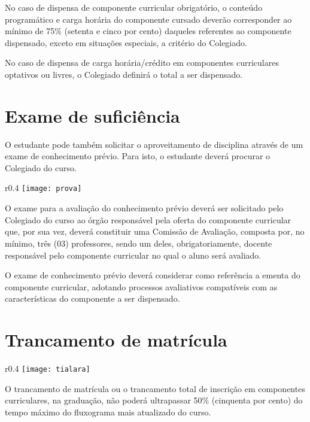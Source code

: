 No caso de dispensa de componente curricular obrigatório, o conteúdo programático e carga horária do componente cursado deverão corresponder ao mínimo de 75\% (setenta e cinco por cento) daqueles referentes ao componente dispensado, exceto em situações especiais, a critério do Colegiado.

No caso de dispensa de carga horária/crédito em componentes curriculares optativos ou livres, o Colegiado definirá o total a ser dispensado.

\section{Exame de suficiência}

O estudante pode também solicitar o aproveitamento de disciplina através de um exame de conhecimento prévio. Para isto, o estudante deverá procurar o Colegiado do curso.

 \begin{wrapfigure}{r}{0.4\textwidth}
        \centering
        \texttt{[image: prova]}
    \end{wrapfigure}

O exame para a avaliação do conhecimento prévio deverá ser solicitado pelo Colegiado do curso ao órgão responsável pela oferta do componente curricular que, por sua vez, deverá constituir uma Comissão de Avaliação, composta por, no mínimo, três (03) professores, sendo um deles, obrigatoriamente, docente responsável pelo componente curricular no qual o aluno será avaliado. 

O exame de conhecimento prévio deverá considerar como referência a ementa do componente curricular, adotando processos avaliativos compatíveis com as características do componente a ser dispensado.

\section{Trancamento de matrícula}

    \begin{wrapfigure}{r}{0.4\textwidth}
        \centering
        \texttt{[image: tialara]}
    \end{wrapfigure}

O trancamento de matrícula ou o trancamento total de inscrição em componentes curriculares, na graduação, não poderá ultrapassar 50\% (cinquenta por cento) do tempo máximo do fluxograma mais atualizado do curso. 
    
